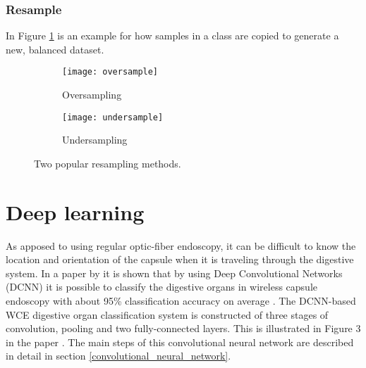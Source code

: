 \documentclass[thesis.tex]{subfiles}
\begin{document}
\subsubsection{Resample}
In Figure \ref{fig:oversample} is an example for how samples in a class are copied to generate a new, balanced dataset.

\begin{figure} %
  \centering
  \begin{subfigure}[b]{0.4\linewidth}
    \centering
    \texttt{[image: oversample]}
    \caption{Oversampling}
    \label{fig:oversample}
  \end{subfigure}
  \quad
  \begin{subfigure}[b]{0.4\linewidth}
    \centering
    \texttt{[image: undersample]}
    \caption{Undersampling}
    \label{fig:undersample}
  \end{subfigure}
  \caption[Two popular resampling methods]{Two popular resampling methods.}
  \label{fig:resampling}
\end{figure}






\newpage
\section{Deep learning} \label{sec:deep_learning}
As apposed to using regular optic-fiber endoscopy, it can be difficult to know the location and orientation of the capsule when it is traveling through the digestive system. In a paper by \citeauthor*{ClassifyingDigestive15} it is shown that by using Deep Convolutional Networks (DCNN) it is possible to classify the digestive organs in wireless capsule endoscopy with about 95\% classification accuracy on average \cite{ClassifyingDigestive15}.
The DCNN-based WCE digestive organ classification system is constructed of three stages of convolution, pooling and two fully-connected layers. This is illustrated in Figure 3 in the paper \cite{ClassifyingDigestive15}. The main steps of this convolutional neural network are described in detail in section \ref{convolutional_neural_network}.
\end{document}

